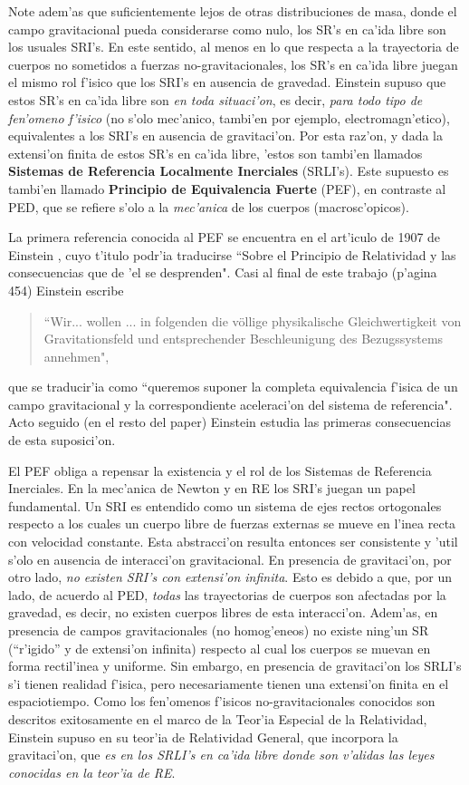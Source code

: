 Note adem'as que suficientemente lejos de otras distribuciones de masa, donde el campo gravitacional pueda considerarse como nulo, los SR's en ca'ida libre son los usuales SRI's. En este sentido, al menos en lo que respecta a la trayectoria de cuerpos no sometidos a fuerzas no-gravitacionales, los SR's en ca'ida libre juegan el mismo rol f'isico que los SRI's en ausencia de gravedad. Einstein supuso que estos SR's en ca'ida libre son \textit{en toda situaci'on}, es decir, \textit{para todo tipo de fen'omeno f'isico} (no s'olo mec'anico, tambi'en por ejemplo, electromagn'etico), equivalentes a los SRI's en ausencia de gravitaci'on. Por esta raz'on, y dada la extensi'on finita de estos SR's en ca'ida libre, 'estos son tambi'en llamados \textbf{Sistemas de Referencia Localmente Inerciales} (SRLI's). Este supuesto es tambi'en llamado \textbf{Principio de Equivalencia Fuerte} (PEF), en contraste al PED, que se refiere s'olo a la \emph{mec'anica} de los cuerpos (macrosc'opicos).

La primera referencia conocida al PEF se encuentra en el art'iculo de 1907 de Einstein \cite{Einstein07}, cuyo t'itulo podr'ia traducirse ``Sobre el Principio de Relatividad y las consecuencias que de 'el se desprenden".
 Casi al final de este trabajo (p'agina 454) Einstein escribe 
\begin{quotation}
``Wir... wollen ... in folgenden die v\"ollige physikalische Gleichwertigkeit von Gravitationsfeld und entsprechender Beschleunigung des Bezugssystems annehmen",
\end{quotation}
que se traducir'ia como ``queremos suponer la completa equivalencia f'isica de un campo gravitacional y la correspondiente aceleraci'on del sistema de referencia". Acto seguido (en el resto del paper) Einstein estudia las primeras consecuencias de esta suposici'on.
 
El PEF obliga a repensar la existencia y el rol de los Sistemas de Referencia Inerciales. En la mec'anica de Newton y en RE los SRI's juegan un papel fundamental. Un SRI es entendido como un sistema de ejes rectos ortogonales respecto a los cuales un cuerpo libre de fuerzas externas se mueve en l'inea recta con velocidad constante. Esta abstracci'on resulta entonces ser consistente y 'util s'olo en ausencia de interacci'on gravitacional. En presencia de gravitaci'on, por otro lado, \textit{no existen SRI's con extensi'on infinita}. Esto es debido a que, por un lado, de acuerdo al PED, \textit{todas} las trayectorias de cuerpos son afectadas por la gravedad, es decir, no existen cuerpos libres de esta interacci'on. Adem'as, en presencia de campos gravitacionales (no homog'eneos) no existe ning'un SR (``r'igido'' y de extensi'on infinita) respecto al cual los cuerpos se muevan en forma rectil'inea y uniforme.
Sin embargo, en presencia de gravitaci'on los SRLI's s'i tienen realidad f'isica, pero necesariamente tienen una extensi'on finita en el espaciotiempo.
Como los fen'omenos f'isicos no-gravitacionales conocidos son descritos exitosamente en el marco de la Teor'ia Especial de la Relatividad, Einstein supuso en su teor'ia de Relatividad General, que incorpora la gravitaci'on, que \textit{es en los SRLI's en ca'ida libre donde son v'alidas las leyes conocidas en la teor'ia de RE}.

